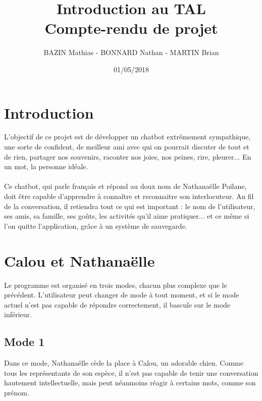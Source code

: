 \documentclass[paper=a4, fontsize=11pt]{article}
\begin{document}
\title{Introduction au TAL\\Compte-rendu de projet}
\author{BAZIN Mathias - BONNARD Nathan - MARTIN Brian}
\date{01/05/2018}
\maketitle

\vspace{1.0cm}

\section{Introduction}

L'objectif de ce projet est de développer un chatbot extrêmement sympathique, une sorte de confident, de meilleur ami avec qui on pourrait discuter de tout et de rien, partager nos souvenirs, raconter nos joies, nos peines, rire, pleurer... En un mot, la personne idéale.
\paragraph{} Ce chatbot, qui parle français et répond au doux nom de Nathanaëlle Poilane, doit être capable d'apprendre à connaître et reconnaitre son interlocuteur. Au fil de la conversation, il retiendra tout ce qui est important : le nom de l'utilisateur, ses amis, sa famille, ses goûts, les activités qu'il aime pratiquer... et ce même si l'on quitte l'application, grâce à un système de sauvegarde.

\vspace{0.5cm}

\section{Calou et Nathanaëlle}

Le programme est organisé en trois modes, chacun plus complexe que le précédent. L'utilisateur peut changer de mode à tout moment, et si le mode actuel n'est pas capable de répondre correctement, il bascule sur le mode inférieur.

\subsection{Mode 1}

Dans ce mode, Nathanaëlle cède la place à Calou, un adorable chien. Comme tous les représentants de son espèce, il n'est pas capable de tenir une conversation hautement intellectuelle, mais peut néanmoins réagir à certains mots, comme son prénom.
\end{document}
